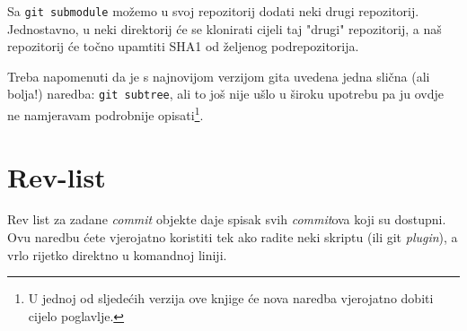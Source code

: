 Sa \verb+git submodule+ možemo u svoj repozitorij dodati neki drugi repozitorij. 
Jednostavno, u neki direktorij će se klonirati cijeli taj "drugi" repozitorij, a naš repozitorij će točno upamtiti SHA1 od željenog podrepozitorija.

Treba napomenuti da je s najnovijom verzijom gita uvedena jedna slična (ali bolja!) naredba: \verb+git subtree+, ali to još nije ušlo u široku upotrebu pa ju ovdje ne namjeravam podrobnije opisati\footnote{U jednoj od sljedećih verzija ove knjige će nova naredba vjerojatno dobiti cijelo poglavlje.}.

\section*{Rev-list}

Rev list za zadane \emph{commit} objekte daje spisak svih \emph{commit}ova koji su dostupni.
Ovu naredbu ćete vjerojatno koristiti tek ako radite neki skriptu (ili git \emph{plugin}), a vrlo rijetko direktno u komandnoj liniji.

